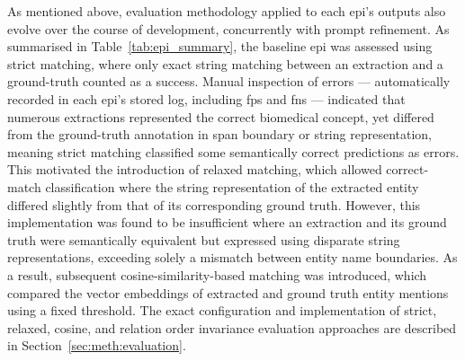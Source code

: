 As mentioned above, evaluation methodology applied to each \gls{epi}'s outputs also evolve over the course of development, concurrently with prompt refinement. As summarised in Table~\ref{tab:epi_summary}, the baseline \gls{epi} was assessed using strict matching, where only exact string matching between an extraction and a ground-truth counted as a success. Manual inspection of errors --- automatically recorded in each \gls{epi}'s stored log, including \glspl{fp} and \glspl{fn} --- indicated that numerous extractions represented the correct biomedical concept, yet differed from the ground-truth annotation in span boundary or string representation, meaning strict matching classified some semantically correct predictions as errors. This motivated the introduction of relaxed matching, which allowed correct-match classification where the string representation of the extracted entity differed slightly from that of its corresponding ground truth. However, this implementation was found to be insufficient where an extraction and its ground truth were semantically equivalent but expressed using disparate string representations, exceeding solely a mismatch between entity name boundaries. As a result, subsequent cosine-similarity-based matching was introduced, which compared the vector embeddings of extracted and ground truth entity mentions using a fixed threshold. The exact configuration and implementation of strict, relaxed, cosine, and relation order invariance evaluation approaches are described in Section~\ref{sec:meth:evaluation}.




